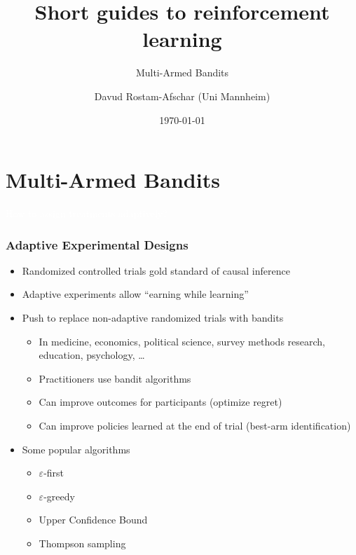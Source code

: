 \documentclass[11pt,table]{beamer}
\title[]{Short guides to reinforcement learning}
\subtitle[]{Multi-Armed Bandits}
\author[D. Rostam-Afschar]{\textcolor{gray1}{Davud Rostam-Afschar (Uni Mannheim)}}
\date[]{\today}
\begin{document}
\begin{frame}[plain]
  \titlepage
\end{frame}




\section{Multi-Armed Bandits}


{
\begin{frame}
\centering
\Huge
\textcolor{white}{How to assign treatments adaptively?}
\thispagestyle{empty}
\end{frame}
}



\renewcommand{\baselinestretch}{1}




\begin{frame}\frametitle{Adaptive Experimental Designs}
\renewcommand{\baselinestretch}{1}
\begin{itemize}
    \item Randomized controlled trials gold standard of causal inference
    \item Adaptive experiments allow ``earning while learning''
    \item Push to replace non-adaptive randomized trials with bandits\pause
    \begin{itemize}
        \item In medicine, economics, political science, survey methods research, education, psychology, \ldots
        \item Practitioners use bandit algorithms\pause
        \item Can improve outcomes for participants (optimize regret)
        \item Can improve policies learned at the end of trial (best-arm identification)\pause
    \end{itemize}
    \item Some popular algorithms\pause
    \begin{itemize}
        \item $\varepsilon$-first\pause
        \item $\varepsilon$-greedy\pause
        \item Upper Confidence Bound\pause
        \item Thompson sampling
    \end{itemize}
\end{itemize}

\end{frame}
\end{document}
